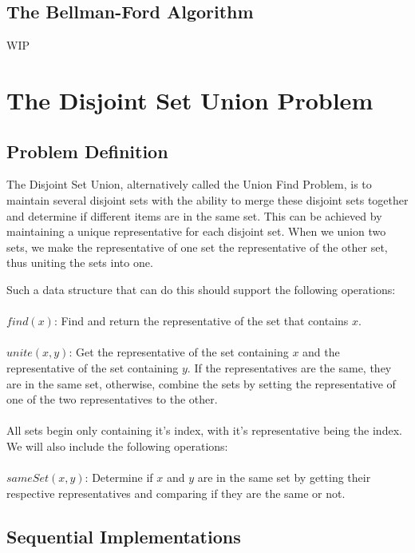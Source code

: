 \documentclass[conference]{IEEEtran}
\begin{document}
\subsection{The Bellman-Ford Algorithm}\label{AA}
WIP



\section{The Disjoint Set Union Problem}

\subsection{Problem Definition}
The Disjoint Set Union, alternatively called the Union Find Problem, is to maintain several disjoint sets with the ability to merge these disjoint sets together and determine if different items are in the same set. This can be achieved by maintaining a unique representative for each disjoint set. When we union two sets, we make the representative of one set the representative of the other set, thus uniting the sets into one.

Such a data structure that can do this should support the following operations: \\ \\
$find(x)$: Find and return the representative of the set that contains $x$. \\ \\
$unite(x, y)$: Get the representative of the set containing $x$ and the representative of the set containing $y$. If the representatives are the same, they are in the same set, otherwise, combine the sets by setting the representative of one of the two representatives to the other. \\ \\
All sets begin only containing it's index, with it's representative being the index. We will also include the following operations: \\ \\
$sameSet(x, y)$: Determine if $x$ and $y$ are in the same set by getting their respective representatives and comparing if they are the same or not.

\subsection{Sequential Implementations}
\end{document}
